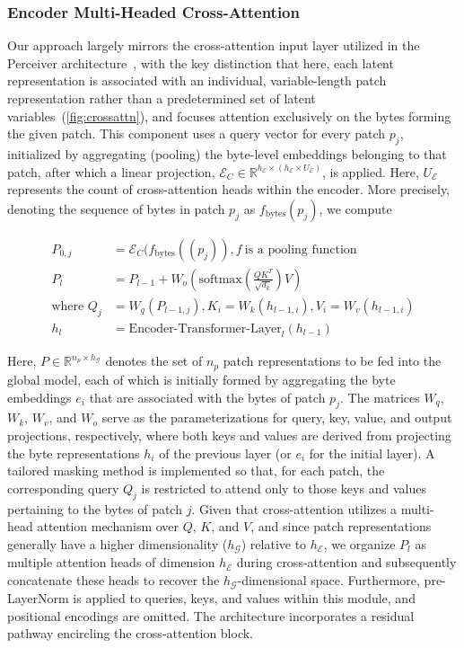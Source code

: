 \subsubsection{Encoder Multi-Headed Cross-Attention}
\label{sec:enc-cross-attn}
Our approach largely mirrors the cross-attention input layer utilized in the Perceiver architecture~\citep{jaegle2021perceiver}, with the key distinction that here, each latent representation is associated with an individual, variable-length patch representation rather than a predetermined set of latent variables~(\autoref{fig:crossattn}), and focuses attention exclusively on the bytes forming the given patch. This component uses a query vector for every patch $p_j$, initialized by aggregating (pooling) the byte-level embeddings belonging to that patch, after which a linear projection, $\mathcal{E}_{C} \in \mathbb{R}^{h_{\mathcal{E}} \times (h_{\mathcal{E}} \times U_{\mathcal{E}})}$, is applied. Here, $U_{\mathcal{E}}$ represents the count of cross-attention heads within the encoder. More precisely, denoting the sequence of bytes in patch $p_j$ as $f_{\text{bytes}}(p_j)$, we compute

\begin{align}
P_{0,j} &= \mathcal{E}_{C}(f_\text{bytes}((p_j)), f~ \text{is a pooling function} \\
P_l &= P_{l-1} + W_o\left(\text{softmax}\left(\frac{QK^T}{\sqrt{d_k}}\right)V\right) \\
\text{where } Q_j &= W_q(P_{l-1,j}), K_i = W_k(h_{l-1,i}), V_i = W_v(h_{l-1,i}) \\
h_l &= \text{Encoder-Transformer-Layer}_l(h_{l-1})
\end{align}

Here, $P \in \mathbb{R}^{n_p \times h_{\mathcal{G}}}$ denotes the set of $n_p$ patch representations to be fed into the global model, each of which is initially formed by aggregating the byte embeddings $e_i$ that are associated with the bytes of patch $p_j$. The matrices $W_q$, $W_k$, $W_v$, and $W_o$ serve as the parameterizations for query, key, value, and output projections, respectively, where both keys and values are derived from projecting the byte representations $h_i$ of the previous layer (or $e_i$ for the initial layer). A tailored masking method is implemented so that, for each patch, the corresponding query $Q_j$ is restricted to attend only to those keys and values pertaining to the bytes of patch $j$. Given that cross-attention utilizes a multi-head attention mechanism over $Q$, $K$, and $V$, and since patch representations generally have a higher dimensionality ($h_{\mathcal{G}}$) relative to $h_{\mathcal{E}}$, we organize $P_l$ as multiple attention heads of dimension $h_{\mathcal{E}}$ during cross-attention and subsequently concatenate these heads to recover the $h_{\mathcal{G}}$-dimensional space. Furthermore, pre-LayerNorm is applied to queries, keys, and values within this module, and positional encodings are omitted. The architecture incorporates a residual pathway encircling the cross-attention block.

